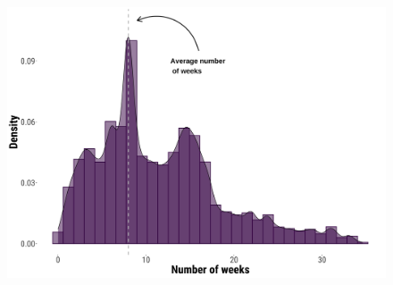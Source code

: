 \documentclass[
  11pt,
]{article}
\begin{document}
\begin{figure}

\begin{minipage}{\linewidth}
\begin{center}
\includegraphics[width=5.20833in,height=\textheight]{../outputs/sm/returns-duration.png}
\end{center}
\end{minipage}%

\end{figure}%
\end{document}
